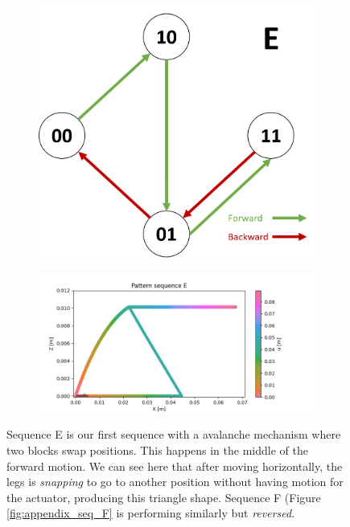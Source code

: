         \begin{figure}[h]
            \centering
            \begin{subfigure}{.2\textwidth}
            \includegraphics[width=\textwidth]{images/S_E.png}
            \end{subfigure}%
            \begin{subfigure}{.6\textwidth}
            \includegraphics[width=\textwidth]{images/E.png}
            \end{subfigure}
            \caption{Sequence E is our first sequence with a avalanche mechanism where two blocks swap positions. This happens in the middle of the forward motion. We can see here that after moving horizontally, the legs is \textit{snapping} to go to another position without having motion for the actuator, producing this triangle shape. Sequence F (Figure \ref{fig:appendix_seq_F} is performing similarly but \textit{reversed}.}
        \end{figure}
        

